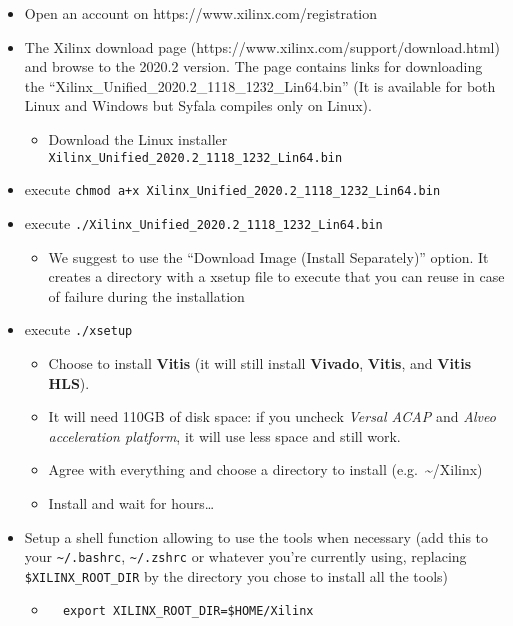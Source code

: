 \begin{itemize}
\item
  Open an account on https://www.xilinx.com/registration
\item
  The Xilinx download page
  (https://www.xilinx.com/support/download.html) and browse to the
  2020.2 version. The page contains links for downloading the
  ``Xilinx\_Unified\_2020.2\_1118\_1232\_Lin64.bin'' (It is available
  for both Linux and Windows but Syfala compiles only on Linux).

  \begin{itemize}
  \item
    Download the Linux installer
    \texttt{Xilinx\_Unified\_2020.2\_1118\_1232\_Lin64.bin}
  \end{itemize}
\item
  execute
  \texttt{chmod\ a+x\ Xilinx\_Unified\_2020.2\_1118\_1232\_Lin64.bin}
\item
  execute \texttt{./Xilinx\_Unified\_2020.2\_1118\_1232\_Lin64.bin}

  \begin{itemize}
  \item
    We suggest to use the ``Download Image (Install Separately)''
    option. It creates a directory with a xsetup file to execute that
    you can reuse in case of failure during the installation
  \end{itemize}
\item
  execute \texttt{./xsetup}

  \begin{itemize}
  \item
    Choose to install \textbf{Vitis} (it will still install
    \textbf{Vivado}, \textbf{Vitis}, and \textbf{Vitis HLS}).
  \item
    It will need 110GB of disk space: if you uncheck \emph{Versal ACAP} and \emph{Alveo acceleration
    platform}, it will use less space and still work.
  \item
    Agree with everything and choose a directory to install
    (e.g.~\textasciitilde/Xilinx)
  \item
    Install and wait for hours\ldots{}
  \end{itemize}
\item
  Setup a shell function allowing to use the tools when necessary (add
  this to your \texttt{\textasciitilde{}/.bashrc},
  \texttt{\textasciitilde{}/.zshrc} or whatever you're currently using,
  replacing \texttt{\$XILINX\_ROOT\_DIR} by the directory you chose to
  install all the tools)

  \begin{itemize}
  \item
\begin{verbatim}
  export XILINX_ROOT_DIR=$HOME/Xilinx
\end{verbatim}
  \end{itemize}
\end{itemize}

